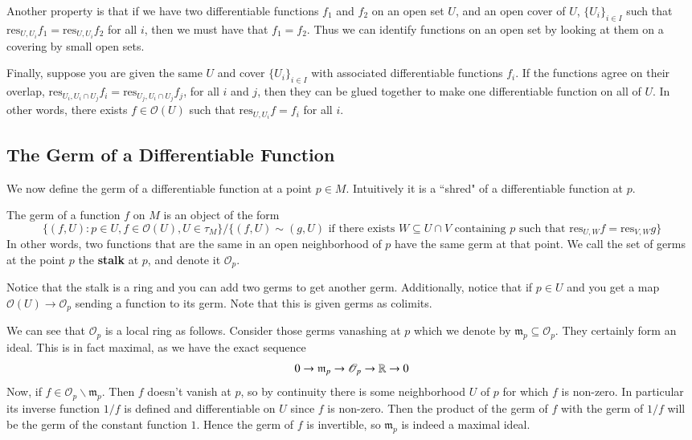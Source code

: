 Another property is that if we have two differentiable functions $f_1$ and $f_2$ on an open set $U$, and an open cover of $U$, $\{U_i\}_{i \in I}$ such that $\text{res}_{U,U_i}f_1 = \text{res}_{U,U_i}f_2$ for all $i$, then we must have that $f_1 = f_2$. Thus we can identify functions on an open set by looking at them on a covering by small open sets.

Finally, suppose you are given the same $U$ and cover $\{U_i\}_{i \in I}$ with associated differentiable functions $f_i$. If the functions agree on their overlap, $\text{res}_{U_i,U_i\cap U_j}f_i = \text{res}_{U_j,U_i\cap U_j}f_j$, for all $i$ and $j$, then they can be glued together to make one differentiable function on all of $U$. In other words, there exists $f \in \mathscr{O}(U)$ such that $\text{res}_{U,U_i}f = f_i$ for all $i$.


\subsection{The Germ of a Differentiable Function}

We now define the germ of a differentiable function at a point $p \in M$. Intuitively it is a ``shred" of a differentiable function at $p$.

\begin{definition}
    The germ of a function $f$ on $M$ is an object of the form $$\{(f,U):p\in U,f \in\mathscr{O}(U),U \in \tau_M\}/\{(f,U)\sim(g,U)\text{ if there exists } W \subseteq U\cap V\text{ containing $p$ such that }\text{res}_{U,W}f = \text{res}_{V,W}g\}$$
    In other words, two functions that are the same in an open neighborhood of $p$ have the same germ at that point. We call the set of germs at the point $p$ the \textbf{stalk} at $p$, and denote it $\mathscr{O}_p$.
\end{definition}

Notice that the stalk is a ring and you can add two germs to get another germ. Additionally, notice that if $p \in U$ and you get a map $\mathscr{O}(U)\rightarrow \mathscr{O}_p$ sending a function to its germ. Note that this is given germs as colimits.

We can see that $\mathscr{O}_p$ is a local ring as follows. Consider those germs vanashing at $p$ which we denote by $\mathfrak{m}_p \subseteq \mathscr{O}_p$. They certainly form an ideal. This is in fact maximal, as we have the exact sequence \begin{equation*}
    0\rightarrow \mathfrak{m}_p \rightarrow \mathscr{O}_p\rightarrow \mathbb R\rightarrow 0
\end{equation*}
Now, if $f \in \mathscr{O}_p\backslash\mathfrak{m}_p$. Then $f$ doesn't vanish at $p$, so by continuity there is some neighborhood $U$ of $p$ for which $f$ is non-zero. In particular its inverse function $1/f$ is defined and differentiable on $U$ since $f$ is non-zero. Then the product of the germ of $f$ with the germ of $1/f$ will be the germ of the constant function $1$. Hence the germ of $f$ is invertible, so $\mathfrak{m}_p$ is indeed a maximal ideal.

